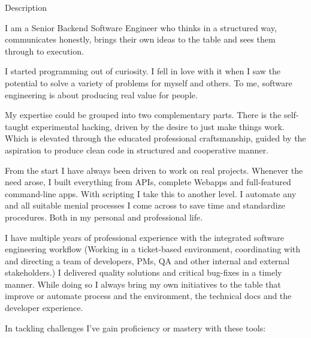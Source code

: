 \documentclass{cv}
\begin{document}
\begin{rSection}{Description}

  \newcommand\skillWidth{0.48}
  \begin{minipage}[t]{\skillWidth\linewidth}

    I am a Senior Backend Software Engineer who thinks in a structured way, communicates honestly, brings their own ideas to the table and sees them through to execution.

    \medskip

I started programming out of curiosity.
I fell in love with it when I saw the potential to solve a variety of problems for myself and others.
To me, software engineering is about producing real value for people.

\medskip

My expertise could be grouped into two complementary parts.
There is the self-taught experimental hacking, driven by the desire to just make things
work. Which is elevated through the educated professional craftsmanship, guided
by the aspiration to produce clean code in structured and cooperative manner.

\medskip

From the start I have always been driven to work on real projects.
Whenever the need arose, I built everything from APIs, complete Webapps and full-featured command-line apps.
With scripting I take this to another level.
I automate any and all suitable menial processes I come across to save time and standardize procedures.
Both in my personal and professional life.

\medskip

  \end{minipage}
  \hfill
  \begin{minipage}[t]{\skillWidth\linewidth}

    I have multiple years of professional experience with the integrated software engineering workflow (Working in a ticket-based environment, coordinating with and directing a
    team of developers, PMs, QA and other internal and external stakeholders.)
    I delivered quality solutions and critical bug-fixes in a timely manner.
    While doing so I always bring my own initiatives to the table that improve or automate process and the environment, the technical docs and the developer experience.

    \medskip

    In tackling challenges I've gain proficiency or mastery with these tools:


\end{minipage}
\end{rSection}
\end{document}
